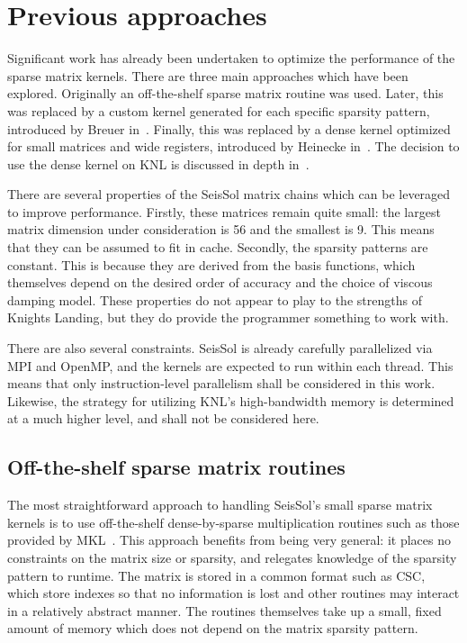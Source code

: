\section{Previous approaches}

    Significant work has already been undertaken to optimize the performance of the sparse matrix kernels. There are three main approaches which have been explored. Originally an off-the-shelf sparse matrix routine was used. Later, this was replaced by a custom kernel generated for each specific sparsity pattern, introduced by Breuer in~\cite{breuer}. Finally, this was replaced by a dense kernel optimized for small matrices and wide registers, introduced by Heinecke in~\cite{Heinecke:2016:LAS:3014904.3015017}. The decision to use the dense kernel on KNL is discussed in depth in~\cite{Jeffers:2016:IXP:3050856}. 
    
    There are several properties of the SeisSol matrix chains which can be leveraged to improve performance. Firstly, these matrices remain quite small: the largest matrix dimension under consideration is 56 and the smallest is 9. This means that they can be assumed to fit in cache. Secondly, the sparsity patterns are constant. This is because they are derived from the basis functions, which themselves depend on the desired order of accuracy and the choice of viscous damping model. These properties do not appear to play to the strengths of Knights Landing, but they do provide the programmer something to work with.

    There are also several constraints. SeisSol is already carefully parallelized via MPI and OpenMP, and the kernels are expected to run within each thread. This means that only instruction-level parallelism shall be considered in this work. Likewise, the strategy for utilizing KNL's high-bandwidth memory is determined at a much higher level, and shall not be considered here.

\subsection{Off-the-shelf sparse matrix routines}

      The most straightforward approach to handling SeisSol's small sparse matrix kernels is to use off-the-shelf dense-by-sparse multiplication routines such as those provided by MKL~\cite{IntelCSCMM}. This approach benefits from being very general: it places no constraints on the matrix size or sparsity, and relegates knowledge of the sparsity pattern to runtime. The matrix is stored in a common format such as CSC, which store indexes so that no information is lost and other routines may interact in a relatively abstract manner. The routines themselves take up a small, fixed amount of memory which does not depend on the matrix sparsity pattern.

